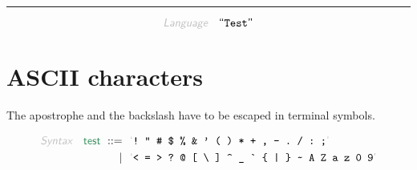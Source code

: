 

\begin{center}
\rule{3in}{0.4pt}
\end{center}

\begin{displaymath}
\KEY{Language} \quad \STRING{Test}
\end{displaymath}

\section{ASCII characters}\hypertarget{ascii-characters}{}\label{ascii-characters}

The apostrophe and the backslash have to be escaped in terminal symbols.

\begin{align*}
  \KEY{Syntax} \quad
     \SYN{test}
      \ ::= \ & \
      \LEX{{!}~{"}~{\HASH}~{\DOLLAR}~{\PERCENT}~{\AMPERSAND}~{\APOSTROPHE}~{(}~{)}~{*}~{+}~{,}~{-}~{.}~{/}~{:}~{;}} \\
      \ \mid \ & \ \LEX{{<}~{=}~{>}~{?}~{@}~{[}~{\BACKSLASH}~{]}~{\CARET}~{\UNDERSCORE}~{\GRAVE}~{\LEFTBRACE}~{|}~{\RIGHTBRACE}~{\TILDE}~A~Z~a~z~0~9}
\end{align*}


